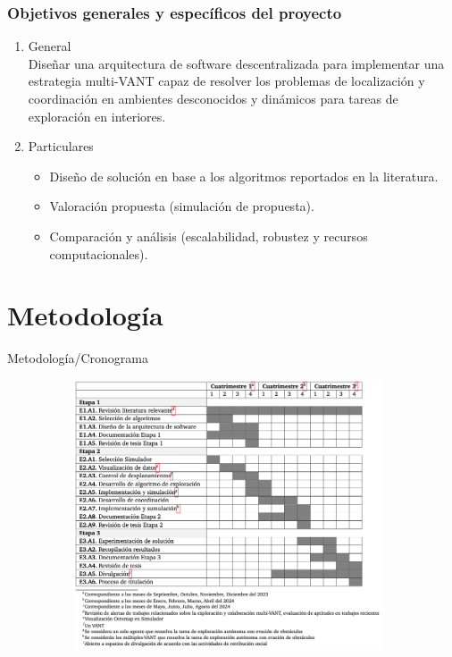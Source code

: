 \documentclass[
	12pt, %
	aspectratio=169, %
]{beamer}
\begin{document}
\begin{frame}
  
  \frametitle{Objetivos generales y específicos del proyecto}

  \begin{enumerate}
  \item<1-> General \\
    Diseñar una arquitectura de software descentralizada para implementar una estrategia multi-VANT capaz de resolver los problemas de localización y coordinación en ambientes desconocidos y dinámicos para tareas de exploración en interiores.
    \pause
  \item<2-> Particulares\\
    \begin{itemize}
    \item Diseño de solución en base a los algoritmos reportados en la literatura.
      \pause
    \item Valoración propuesta (simulación de propuesta).
      \pause
    \item Comparación y análisis (escalabilidad, robustez y recursos computacionales).
    \end{itemize}
    
  \end{enumerate}
\end{frame}

\section{Metodología}
\begin{frame}{Metodología/Cronograma}

  \begin{figure}
    \centering
    \includegraphics[width=11cm, height=8cm]{cronograma}
  \end{figure}
  
\end{frame}
\end{document}
